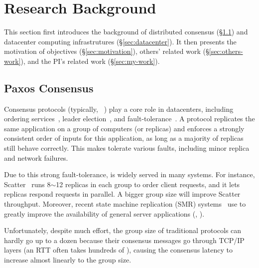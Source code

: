 \vspace{-.15in}\section{Research Background} 
\label{sec:background}\vspace{-.075in}

This section first introduces the background of distributed consensus 
(\S\ref{sec:consensus}) and datacenter computing infrastrutures 
(\S\ref{sec:datacenter}). It then presents the motivation of objectives
(\S\ref{sec:motivation}), others' related work (\S\ref{sec:others-work}), and 
the PI's related work (\S\ref{sec:my-work}).

\vspace{-.15in}\subsection{Paxos Consensus} 
\label{sec:consensus}\vspace{-.075in}

Consensus protocols (typically, 
\paxos~\cite{paxos:practical,paxos,paxos:simple,paxos:complex}) play a core
role in datacenters, including 
ordering services~\cite{ellis:thesis,manos:hotdep10,scatter:sosp11},
leader election~\cite{zookeeper, chubby:osdi}, and
fault-tolerance~\cite{eve:osdi12,rex:eurosys14,crane:sosp15}. A \paxos protocol
replicates the same application on a group of computers (or replicas) and 
enforces a strongly consistent order of inputs for this application, as long as 
a majority of replicas still behave correctly. This makes \paxos tolerate 
various faults, including minor replica and network failures.

Due to this strong fault-tolerance, \paxos is widely served in many systems.
For instance, Scatter~\cite{scatter:sosp11} runs 8$\sim$12 replicas in each
\paxos group to order client requests, and it lets replicas respond requests
in parallel. A bigger group size will improve Scatter throughput. 
Moreover, recent state machine replication (SMR) 
systems~\cite{eve:osdi12,rex:eurosys14,crane:sosp15} use \paxos to greatly 
improve the availability of general server applications (\eg, \mysql).

Unfortunately, despite much effort, the group size of traditional \paxos 
protocols can hardly go up to a dozen because their consensus messages 
go through TCP/IP layers (an RTT often takes hundreds of \us), causing the 
consensus latency to increase almost linearly to the group size.

